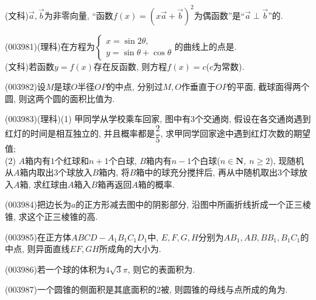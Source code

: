 (文科)$\overrightarrow a,\overrightarrow b$为非零向量, ``函数$f(x)=(x\overrightarrow a+\overrightarrow b)^2$为偶函数''是``$\overrightarrow a\perp \overrightarrow b$''的.
\item (003981)(理科)在方程为$\begin{cases}
x=\sin 2\theta,\\ y=\sin\theta+\cos\theta
\end{cases}$的曲线上的点是.
\\
(文科)若函数$y=f(x)$存在反函数, 则方程$f(x)=c$($c$为常数).
\item (003982)设$M$是球$O$半径$OP$的中点, 分别过$M,O$作垂直于$OP$的平面, 截球面得两个圆, 则这两个圆的面积比值为.
\item (003983)(理科)(1) 甲同学从学校乘车回家, 图中有$3$个交通岗, 假设在各交通岗遇到红灯的时间是相互独立的, 并且概率都是$\dfrac 25$, 求甲同学回家途中遇到红灯次数的期望值;\\
(2) $A$箱内有$1$个红球和$n+1$个白球, $B$箱内有$n-1$个白球($n\in \mathbf{N}, \ n\ge 2$), 现随机从$A$箱内取出$3$个球放入$B$箱内, 将$B$箱中的球充分搅拌后, 再从中随机取出$3$个球放入$A$箱, 求红球由$A$箱入$B$箱再返回$A$箱的概率.
\item (003984)把边长为$a$的正方形减去图中的阴影部分, 沿图中所画折线折成一个正三棱锥, 求这个正三棱锥的高.
\begin{center}
\end{center}
\item (003985)在正方体$ABCD-A_1B_1C_1D_1$中, $E,F,G,H$分别为$AB_1,AB,BB_1,B_1C_1$的中点, 则异面直线$EF,GH$所成角的大小为.
\item (003986)若一个球的体积为$4\sqrt{3}\pi$, 则它的表面积为.
\item (003987)一个圆锥的侧面积是其底面积的$2$被, 则圆锥的母线与点所成的角为.
